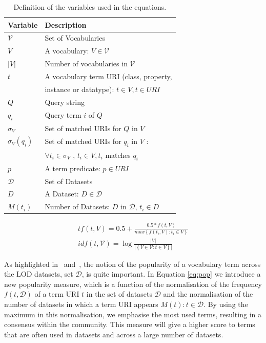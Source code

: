 \documentclass{iosart2c}
\begin{document}
\begin{table}[h!tb]
\caption{Definition of the variables used in the equations.}
\label{tab:variable}
\begin{tabular}{|l|l|}
  \hline
  \textbf{Variable} & \textbf{Description} \\ \hline
  $\mathcal{V}$ & Set of Vocabularies \\ \hline
  $V$ & A vocabulary: $V \in \mathcal{V}$ \\ \hline
  $|V|$ & Number of vocabularies in $\mathcal{V}$ \\ \hline
  $t$ & A vocabulary term URI (class, property, \\
       &  instance or datatype): $t \in V, t \in URI$ \\ \hline
  $Q$ & Query string \\ \hline
  $q_i$ & Query term $i$ of $Q$ \\ \hline
  $\sigma_V$ & Set of matched URIs for $Q$ in $V$ \\ \hline
  $\sigma_V(q_i)$ & Set of matched URIs for $q_i$ in $V$ : \\
         & $\forall t_i \in \sigma_V$ , $t_i \in V ,  t_i$ matches $q_i$ \\ \hline
  $p$ & A term predicate: $p \in URI$ \\ \hline
  $\mathcal{D}$ & Set of Datasets \\ \hline
  $D$ & A Dataset: $D \in \mathcal{D}$ \\ \hline
  $M(t_i)$ & Number of Datasets: $D$ in $\mathcal{D}$, $t_i \in D$ \\ \hline
\end{tabular}
\end{table}

\begin{equation}\label{eq:tfidf}
\begin{split}
tf(t,V) =0.5+ \frac{0.5 * f(t,V)}{max\left\{f(t_i,V): t_i \in V\right\}} \\
idf(t,\mathcal{V}) =\log\frac{|V|}{|\left\{V \in \mathcal{V}: t \in V\right\}|}
\end{split}
\end{equation}
 

As highlighted in~\cite{butt2014} and~\cite{schaible2013lover}, the notion of the popularity of a vocabulary term across the LOD datasets, set $\mathcal{D}$, is quite important. In Equation \ref{eq:pop} we introduce a new popularity measure, which is a function of the normalisation of the frequency $f(t,\mathcal{D})$ of a term URI $t$ in the set of datasets $\mathcal{D}$ and the normalisation of the number of datasets in which a term URI appears $M(t): t \in \mathcal{D}$. By using the maximum in this normalisation, we emphasise the most used terms, resulting in a consensus within the community. This measure will give a higher score to terms that are often used in datasets and across a large number of datasets.
\end{document}
